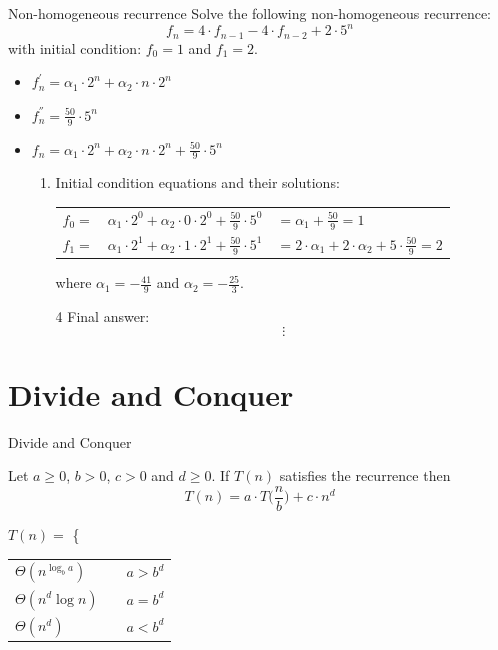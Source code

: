 \documentclass{beamer}
\begin{document}
\begin{frame}{Non-homogeneous recurrence}
    Solve the following non-homogeneous recurrence:
    \begin{equation}\tag{1}
        f_n = 4 \cdot f_{n-1} - 4 \cdot f_{n-2} + 2 \cdot 5^n
    \end{equation}
    with initial condition: $f_0 = 1$ and $f_1 = 2$.
    
    \begin{itemize}
        \item $ f_n^{'} = \alpha_1 \cdot 2^n + \alpha_2 \cdot n \cdot 2^n $
        \item $ f_n^{''} = \frac{50}{9} \cdot 5^n $
        \item $ f_n = \alpha_1 \cdot 2^n + \alpha_2 \cdot n \cdot 2^n + \frac{50}{9} \cdot 5^n $
        \begin{enumerate}[3]
            \item Initial condition equations and their solutions:
                \begin{tabular}{l l l}
                    \rule{0pt}{2ex}   $f_0 = $ & $\alpha_1 \cdot 2^0 + \alpha_2 \cdot 0 \cdot 2^0 + \frac{50}{9} \cdot 5^0$ & $= \alpha_1 + \frac{50}{9} = 1$ \\ 
                    \rule{0pt}{2ex}   $f_1 = $ & $\alpha_1 \cdot 2^1 + \alpha_2 \cdot 1 \cdot 2^1 + \frac{50}{9} \cdot 5^1$ & $= 2 \cdot \alpha_1 + 2 \cdot \alpha_2 + 5 \cdot \frac{50}{9} = 2 $ 
                \end{tabular}
                where $\alpha_1 = -\frac{41}{9} $ and $ \alpha_2 = -\frac{25}{3}$.
            \item[4] Final answer:
                $$ \vdots $$
        \end{enumerate}
    \end{itemize}
\end{frame}

\section{Divide and Conquer}

\begin{frame}{Divide and Conquer}
    \centering
    \begin{theorem}\label{theo:master}
        Let $a \geq 0$, $b > 0$, $c > 0$ and $d \geq 0$.  If $T(n)$ satisfies the recurrence then
        $$ T(n) = a \cdot T \Big(\frac{n}{b}\Big) + c \cdot n^d $$
    \end{theorem}
    
    $T(n) =$ 
    \left\{
    \begin{tabular}{l r r}
        $\Theta (n^{\log_b a})$ & \hspace{1cm} & $a > b^d$ \\
        $\Theta (n^d \log n)$   & \hspace{1cm} & $a = b^d$ \\
        $\Theta (n^d)$          & \hspace{1cm} & $a < b^d$ 
    \end{tabular}
\end{frame}
\end{document}

